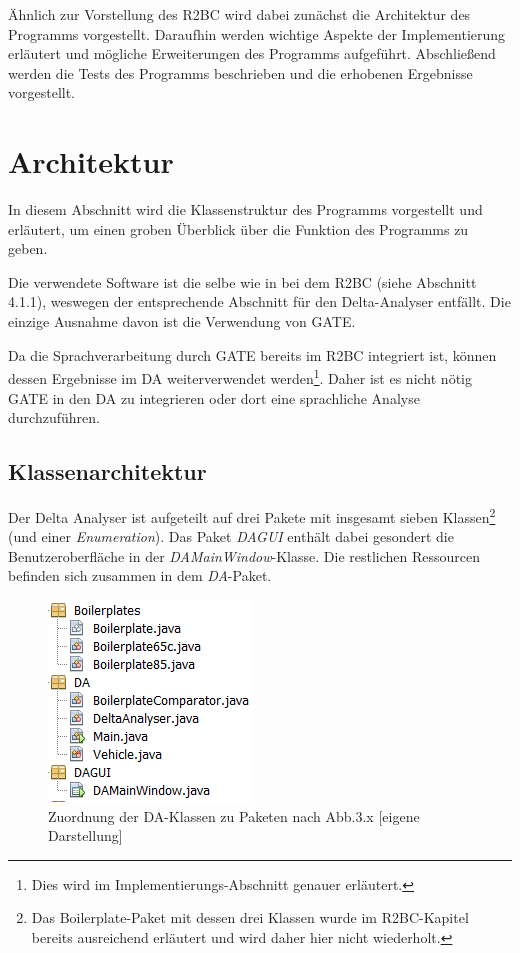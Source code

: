 \documentclass[12pt]{report}
\begin{document}
Ähnlich zur Vorstellung des R2BC wird dabei zunächst die Architektur des Programms vorgestellt. Daraufhin werden wichtige Aspekte der Implementierung erläutert und mögliche Erweiterungen des Programms aufgeführt. Abschließend werden die Tests des Programms beschrieben und die erhobenen Ergebnisse vorgestellt.
 
\section{Architektur}
In diesem Abschnitt wird die Klassenstruktur des Programms vorgestellt und erläutert, um einen groben Überblick über die Funktion des Programms zu geben. 

Die verwendete Software ist die selbe wie in bei dem R2BC (siehe Abschnitt 4.1.1), weswegen der entsprechende Abschnitt für den Delta-Analyser entfällt. Die einzige Ausnahme davon ist die Verwendung von GATE. 

Da die Sprachverarbeitung durch GATE bereits im R2BC integriert ist, können dessen Ergebnisse im DA weiterverwendet werden\footnote{Dies wird im Implementierungs-Abschnitt genauer erläutert.}. Daher ist es nicht nötig GATE in den DA zu integrieren oder dort eine sprachliche Analyse durchzuführen.

\subsection{Klassenarchitektur}
Der Delta Analyser ist aufgeteilt auf drei Pakete mit insgesamt sieben Klassen\footnote{Das Boilerplate-Paket mit dessen drei Klassen wurde im R2BC-Kapitel bereits ausreichend erläutert und wird daher hier nicht wiederholt.} (und einer \textit{Enumeration}). Das Paket \textit{DAGUI} enthält dabei gesondert die Benutzeroberfläche in der \textit{DAMainWindow}-Klasse. Die restlichen Ressourcen befinden sich zusammen in dem \textit{DA}-Paket.

\begin{figure}[h!]
\begin{center}
\includegraphics[scale=1.0]{Bilder/DA-Pakete.png}
\caption{Zuordnung der DA-Klassen zu Paketen nach Abb.3.x [eigene Darstellung]}
\end{center}
\end{figure}
\end{document}
